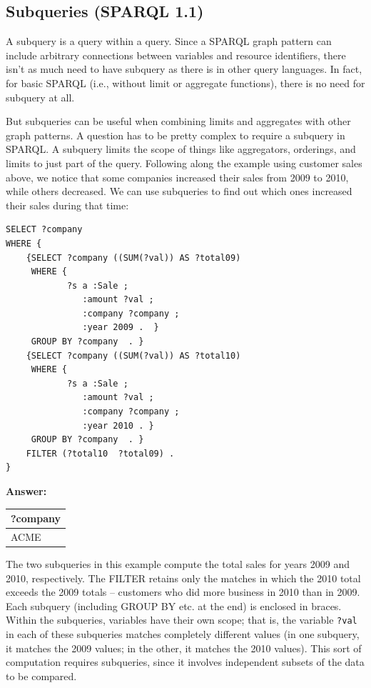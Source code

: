 \subsection{Subqueries (SPARQL 1.1)}

A subquery is a query within a query. Since a SPARQL graph pattern can
include arbitrary connections between variables and resource
identifiers, there isn't as much need to have subquery as there is in
other query languages. In fact, for basic SPARQL (i.e., without limit or
aggregate functions), there is no need for subquery at all.

But subqueries can be useful when combining limits and aggregates with
other graph patterns. A question has to be pretty complex to require a
subquery in SPARQL. A subquery limits the scope of things like
aggregators, orderings, and limits to just part of the query. Following
along the example using customer sales above, we notice that some
companies increased their sales from 2009 to 2010, while others
decreased. We can use subqueries to find out which ones increased their
sales during that time:


\begin{lstlisting}
SELECT ?company
WHERE {
    {SELECT ?company ((SUM(?val)) AS ?total09)
     WHERE {
            ?s a :Sale ;
               :amount ?val ;
               :company ?company ;
               :year 2009 .  }
     GROUP BY ?company  . }
    {SELECT ?company ((SUM(?val)) AS ?total10)
     WHERE {
            ?s a :Sale ;
               :amount ?val ;
               :company ?company ;
               :year 2010 . }
     GROUP BY ?company  . }
    FILTER (?total10  ?total09) .
}
\end{lstlisting}
\textbf{\textbf{Answer:}}

\begin{tabular}{|l|}
\hline
?company\\
\hline
ACME\\
\hline
\end{tabular}

The two subqueries in this example compute the total sales for years
2009 and 2010, respectively. The FILTER retains only the matches in
which the 2010 total exceeds the 2009 totals -- customers who did more
business in 2010 than in 2009. Each subquery (including GROUP BY etc. at
the end) is enclosed in braces. Within the subqueries, variables have
their own scope; that is, the variable \texttt{?val} in each of these subqueries
matches completely different values (in one subquery, it matches the
2009 values; in the other, it matches the 2010 values). This sort of
computation requires subqueries, since it involves independent subsets
of the data to be compared.

